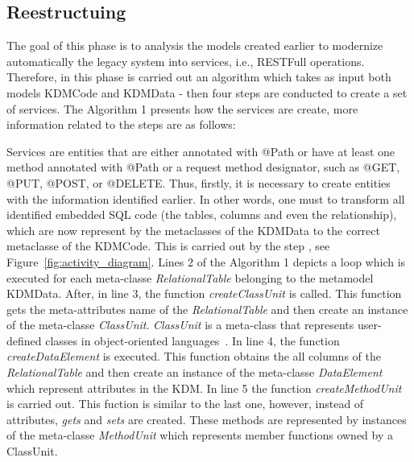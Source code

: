 \documentclass[a4paper,twoside]{article}
\newcommand*\circled[1]{\tikz[baseline=(char.base)]{
  \node[shape=circle,draw, inner sep=0.1pt] (char) {#1};}
}
\begin{document}
\subsection{Reestructuing} %
\label{sub:restructuing}


The goal of this phase is to analysis the models created earlier to modernize automatically the legacy system into services, i.e., RESTFull operations. Therefore, in this phase is carried out an algorithm which takes as input both models KDMCode and KDMData - then four steps are conducted to create a set of services. The Algorithm 1 presents how the services are create, more information related to the steps are as follows:


Services are entities that are either annotated with @Path or have at least one method annotated with @Path or a request method designator, such as @GET, @PUT, @POST, or @DELETE. Thus, firstly, it is necessary to create entities with the information identified earlier. In other words, one must to transform all identified embedded SQL code (the tables, columns and even the relationship), which are now represent by the metaclasses of the KDMData to the correct metaclasse of the KDMCode. This is carried out by the step \circled{\textbf{G}}, see Figure~\ref{fig:activity_diagram}. Lines 2 of the Algorithm 1 depicts a loop which is executed for each meta-classe \textit{RelationalTable} belonging to the metamodel KDMData. After, in line 3, the function \textit{createClassUnit} is called. This function gets the meta-attributes name of the \textit{RelationalTable} and then create an instance of the meta-classe \textit{ClassUnit}. \textit{ClassUnit} is a meta-class that represents user-defined classes in object-oriented languages~\cite{5328801}. In line 4, the function \textit{createDataElement} is executed. This function obtains the all columns of the \textit{RelationalTable} and then create an instance of the meta-classe \textit{DataElement} which represent attributes in the KDM. In line 5 the function \textit{createMethodUnit} is carried out. This fuction is similar to the last one, however, instead of attributes, \textit{gets} and \textit{sets} are created. These methods are represented by instances of the meta-classe \textit{MethodUnit} which represents member functions owned by a ClassUnit.
\end{document}
